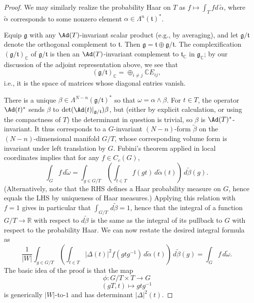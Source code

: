 \documentclass[reqno]{amsart} 
\begin{document}
\begin{proof}
  We may similarly realize the probability Haar on $T$ as $f \mapsto \int_T f d \, \tilde{\alpha}$, where $\tilde{\alpha}$ corresponds to some nonzero element $\alpha \in \Lambda^n(\mathfrak{t})^*$.

  Equip $\mathfrak{g}$ with any $\Ad(T)$-invariant scalar product (e.g., by averaging), and let $\mathfrak{g}/\mathfrak{t}$ denote the orthogonal complement to $\mathfrak{t}$.  Then $\mathfrak{g} = \mathfrak{t} \oplus \mathfrak{g}/\mathfrak{t}$.  The complexification $(\mathfrak{g}/\mathfrak{t})_{\mathbb{C}}$ of $\mathfrak{g}/\mathfrak{t}$ is then an $\Ad(T)$-invariant complement to $\mathfrak{t}_{\mathbb{C}}$ in $\mathfrak{g}_{\mathbb{C}}$; by our discussion of the adjoint representation above, we see that
  \begin{equation*}
    (\mathfrak{g}/\mathfrak{t})_{\mathbb{C}}
    = \oplus_{i \neq j} \mathbb{C} E_{i j},
  \end{equation*}
  i.e., it is the space of matrices whose diagonal entries vanish.
  
  There is a unique $\beta \in \Lambda^{N-n}(\mathfrak{g}/\mathfrak{t})^*$ so that $\omega = \alpha \wedge \beta$.  For $t \in T$, the operator $\Ad(t)^*$ sends $\beta$ to $\det(\Ad(t)|_{\mathfrak{g}/\mathfrak{t}}) \beta$, but (either by explicit calculation, or using the compactness of $T$) the determinant in question is trivial, so $\beta$ is $\Ad(T)^*$-invariant.  It thus corresponds to a $G$-invariant $(N-n)$-form $\tilde{\beta}$ on the $(N-n)$-dimensional manifold $G/T$, whose corresponding volume form is invariant under left translation by $G$.  Fubini's theorem applied in local coordinates implies that for any $f \in C_c(G)$,
  \begin{equation*}
    \int_G f \, d \tilde{\omega}
    =
    \int_{g \in G/T}
    (\int_{t \in T}
    f(g t) \, d \tilde{\alpha}(t))
    \, d \tilde{\beta}(g).
  \end{equation*}
  (Alternatively, note that the RHS defines a Haar probability measure on $G$, hence equals the LHS by uniqueness of Haar measures.)  Applying this relation with $f = 1$ gives in particular that $\int_{G/T} \, d \tilde{\beta} = 1$, hence that the integral of a function $G/T \rightarrow \mathbb{R}$ with respect to $d \tilde{\beta}$ is the same as the integral of its pullback to $G$ with respect to the probability Haar.  We can now restate the desired integral formula as
  \begin{equation}\label{eq:weyl-integral-via-diff-forms}
    \frac{1}{|W|}
    \int_{g \in G/T}
    (\int_{t \in T}
    |\Delta(t)|^2
    f(g t g^{-1}) \, d \tilde{\alpha}(t))
    \, d \tilde{\beta}(g)
    =
    \int_{G}  f \, d \tilde{\omega}.
  \end{equation}
  The basic idea of the proof is that the map
  \begin{equation*}
    \phi : G/T \times T \rightarrow G
  \end{equation*}
  \begin{equation*}
    (g T,t) \mapsto g t g^{-1}
  \end{equation*}
  is generically $|W|$-to-$1$ and has determinant $|\Delta|^2(t)$.


\end{proof}
\end{document}
